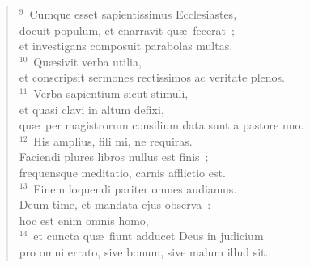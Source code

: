 \begin{verse}${}^{9}$~Cumque esset sapientissimus Ecclesiastes,\\ docuit populum, et enarravit qu\ae\ fecerat~;\\ et investigans composuit parabolas multas.\\
${}^{10}$~Qu\ae sivit verba utilia,\\ et conscripsit sermones rectissimos ac veritate plenos.\\
${}^{11}$~Verba sapientium sicut stimuli,\\ et quasi clavi in altum defixi,\\ qu\ae\ per magistrorum consilium data sunt a pastore uno.\\
${}^{12}$~His amplius, fili mi, ne requiras.\\ Faciendi plures libros nullus est finis~;\\ frequensque meditatio, carnis afflictio est.\\
${}^{13}$~Finem loquendi pariter omnes audiamus.\\ Deum time, et mandata ejus observa~:\\ hoc est enim omnis homo,\\
${}^{14}$~et cuncta qu\ae\ fiunt adducet Deus in judicium\\ pro omni errato, sive bonum, sive malum illud sit.\end{verse}


